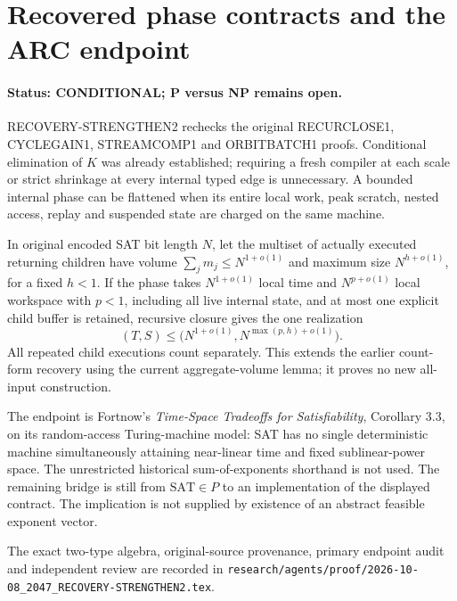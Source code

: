 \section{Recovered phase contracts and the ARC endpoint}
\label{sec:recovery-strengthen2-arc}
\paragraph{Status: CONDITIONAL; P versus NP remains open.}
RECOVERY-STRENGTHEN2 rechecks the original RECURCLOSE1, CYCLEGAIN1,
STREAMCOMP1 and ORBITBATCH1 proofs. Conditional elimination of $K$ was
already established; requiring a fresh compiler at each scale or strict
shrinkage at every internal typed edge is unnecessary. A bounded internal
phase can be flattened when its entire local work, peak scratch, nested
access, replay and suspended state are charged on the same machine.

In original encoded SAT bit length $N$, let the multiset of actually
executed returning children have volume $\sum_jm_j\le N^{1+o(1)}$ and
maximum size $N^{h+o(1)}$, for a fixed $h<1$. If the phase takes
$N^{1+o(1)}$ local time and $N^{p+o(1)}$ local workspace with $p<1$,
including all live internal state, and at most one explicit child buffer
is retained, recursive closure gives the one realization
\[
 (T,S)\le\bigl(N^{1+o(1)},N^{\max(p,h)+o(1)}\bigr).
\]
All repeated child executions count separately. This extends the earlier
count-form recovery using the current aggregate-volume lemma; it proves
no new all-input construction.

The endpoint is Fortnow's \emph{Time-Space Tradeoffs for Satisfiability},
Corollary 3.3, on its random-access Turing-machine model: SAT has no single
deterministic machine simultaneously attaining near-linear time and fixed
sublinear-power space. The unrestricted historical sum-of-exponents
shorthand is not used. The remaining bridge is still from $\mathrm{SAT}\in P$
to an implementation of the displayed contract. The implication is not
supplied by existence of an abstract feasible exponent vector.

The exact two-type algebra, original-source provenance, primary endpoint
audit and independent review are recorded in
\nolinkurl{research/agents/proof/2026-10-08_2047_RECOVERY-STRENGTHEN2.tex}.

